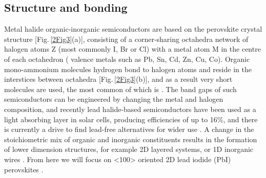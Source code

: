 \subsection{Structure and bonding}
Metal halide  organic-inorganic semiconductors are based on the  perovskite crystal structure [Fig.\,\ref{2Fig3}(a)], consisting of a corner-sharing octahedra network of halogen atoms Z (most commonly I, Br or Cl) with a metal atom M in the centre of each octahedron ( valence metals such as Pb, Sn, Cd, Zn, Cu, Co). Organic mono-ammonium molecules  hydrogen bond to halogen atoms and reside in the interstices between octahedra [Fig.\,\ref{2Fig3}(b)], and as a result very short molecules are used, the most common of which is . The band gaps of such semiconductors can be engineered by changing the metal and halogen composition, and recently lead halide-based semiconductors have been used as a light absorbing layer in solar cells, producing efficiencies of up to 16\%, and there is currently a drive to find lead-free alternatives for wider use \cite{Lee2012, Heo2013, Liu2013, Hao2014}. A change in the stoichiometric mix of organic and inorganic constituents results in the formation of lower dimension structures, for example 2D layered systems, or 1D inorganic wires \cite{Nagami1996, Fukumoto2000, Fujisawa2004, Pradeesh2010}. From here we will focus on <100> oriented 2D lead iodide (PbI) perovskites \cite{Mitzi2001}.

